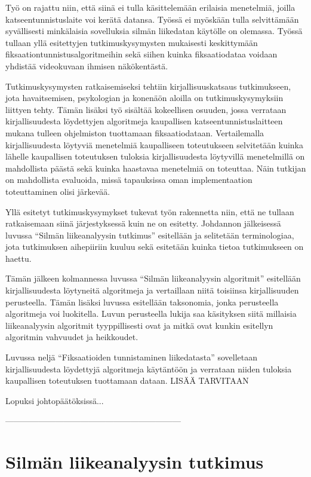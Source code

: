 Työ on rajattu niin, että siinä ei tulla käsittelemään erilaisia menetelmiä, joilla katseentunnistuslaite voi kerätä datansa. Työssä ei myöskään tulla selvittämään syvällisesti minkälaisia sovelluksia silmän liikedatan käytölle on olemassa. Työssä tullaan yllä esitettyjen tutkimuskysymysten mukaisesti keskittymään fiksaationtunnistusalgoritmeihin sekä siihen kuinka fiksaatiodataa voidaan yhdistää videokuvaan ihmisen näkökentästä.

Tutkimuskysymysten ratkaisemiseksi tehtiin kirjallisuuskatsaus tutkimukseen, jota havaitsemisen, psykologian ja konenäön aloilla on tutkimuskysymyksiin liittyen tehty. Tämän lisäksi työ sisältää kokeellisen osuuden, jossa verrataan kirjallisuudesta löydettyjen algoritmeja kaupallisen katseentunnistuslaitteen mukana tulleen ohjelmiston tuottamaan fiksaatiodataan. Vertailemalla kirjallisuudesta löytyviä menetelmiä kaupalliseen toteutukseen selvitetään kuinka lähelle kaupallisen toteutuksen tuloksia kirjallisuudesta löytyvillä menetelmillä on mahdollista päästä sekä kuinka haastavaa menetelmiä on toteuttaa. Näin tutkijan on mahdollista evaluoida, missä tapauksissa oman implementaation toteuttaminen olisi järkevää.

Yllä esitetyt tutkimuskysymykset tukevat työn rakennetta niin, että ne tullaan ratkaisemaan siinä järjestyksessä kuin ne on esitetty. Johdannon jälkeisessä luvussa ``Silmän liikeanalyysin tutkimus''  esitellään ja selitetään terminologiaa, jota tutkimuksen aihepiiriin kuuluu sekä esitetään kuinka tietoa tutkimukseen on haettu. 

Tämän jälkeen kolmannessa luvussa ``Silmän liikeanalyysin algoritmit''  esitellään kirjallisuudesta löytyneitä algoritmeja ja vertaillaan niitä toisiinsa kirjallisuuden perusteella. Tämän lisäksi luvussa esitellään taksonomia, jonka perusteella algoritmeja voi luokitella. Luvun perusteella lukija saa käsityksen siitä millaisia liikeanalyysin algoritmit tyyppillisesti ovat ja mitkä ovat kunkin esitellyn algoritmin vahvuudet ja heikkoudet.

Luvussa neljä ``Fiksaatioiden tunnistaminen liikedatasta''  sovelletaan kirjallisuudesta löydettyjä algoritmeja käytäntöön ja verrataan niiden tuloksia kaupallisen toteutuksen tuottamaan dataan. LISÄÄ TARVITAAN

Lopuksi johtopäätöksissä...
 

---------------------------------------------------------------
\section{Silmän liikeanalyysin tutkimus}


